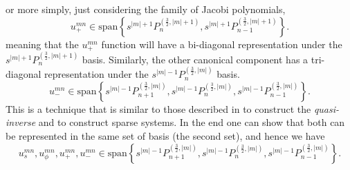 %
or more simply, just considering the family of Jacobi polynomials,
%
\begin{equation}
    u_+^{mn} \in \mathrm{span} \left\{s^{|m|+1} P_n^{(\frac{3}{2}, |m|+1)}, s^{|m|+1} P_{n-1}^{(\frac{3}{2}, |m|+1)}\right\}.
\end{equation}
%
meaning that the $u_+^{mn}$ function will have a bi-diagonal representation under the $s^{|m|+1} P_n^{(\frac{3}{2}, |m|+1)}$ basis. Similarly, the other canonical component has a tri-diagonal representation under the $s^{|m|-1} P_n^{(\frac{3}{2}, |m|)}$ basis. 
%
\begin{equation}
    u_-^{mn} \in \mathrm{span} \left\{s^{|m|-1} P_{n+1}^{(\frac{3}{2}, |m|)}, s^{|m|-1} P_n^{(\frac{3}{2}, |m|)}, s^{|m|-1} P_{n-1}^{(\frac{3}{2}, |m|)}\right\}.
\end{equation}
%
This is a technique that is similar to those described in \citet{marti_quasi-inv_2016} to construct the \textit{quasi-inverse} and \citet{vasil_tensor_2016} to construct sparse systems. In the end one can show that both can be represented in the same set of basis (the second set), and hence we have
%
\begin{equation}
    u_s^{mn}, u_\phi^{mn}, u_+^{mn}, u_-^{mn} \in \mathrm{span} \left\{s^{|m|-1} P_{n+1}^{(\frac{3}{2}, |m|)}, s^{|m|-1} P_n^{(\frac{3}{2}, |m|)}, s^{|m|-1} P_{n-1}^{(\frac{3}{2}, |m|)}\right\}.
\end{equation}
%

